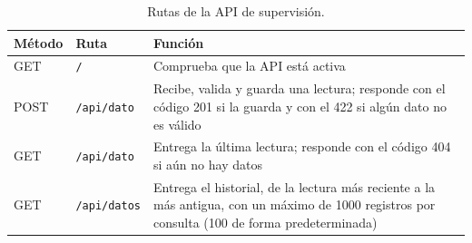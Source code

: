 \begin{table}[H]
\centering
\small
\caption{Rutas de la API de supervisión.}
\label{tab:rutas_api}
\begin{tabularx}{\textwidth}{L{1.6cm}L{3.0cm}Y}
\toprule
\textbf{Método} & \textbf{Ruta} & \textbf{Función}\\
\midrule
GET & \texttt{/} & Comprueba que la API está activa\\
POST & \texttt{/api/dato} & Recibe, valida y guarda una lectura; responde con el código 201 si la guarda y con el 422 si algún dato no es válido\\
GET & \texttt{/api/dato} & Entrega la última lectura; responde con el código 404 si aún no hay datos\\
GET & \texttt{/api/datos} & Entrega el historial, de la lectura más reciente a la más antigua, con un máximo de 1000 registros por consulta (100 de forma predeterminada)\\
\bottomrule
\end{tabularx}
\end{table}
